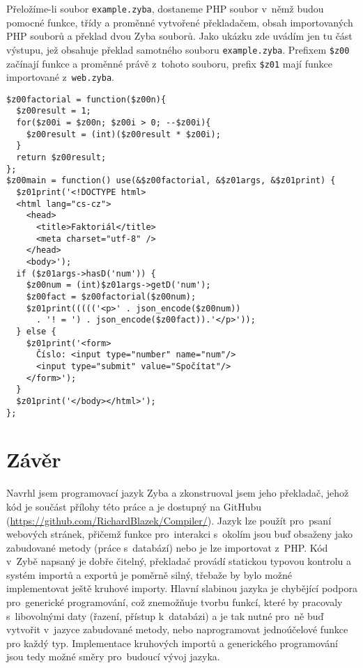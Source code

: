 \documentclass[a4paper,12pt]{article}
\begin{document}
Přeložíme-li soubor \texttt{example.zyba}, dostaneme PHP soubor v~němž budou pomocné funkce, třídy a proměnné vytvořené překladačem, obsah importovaných PHP souborů a překlad dvou Zyba souborů. Jako ukázku zde uvádím jen tu část výstupu, jež obsahuje překlad samotného souboru \texttt{example.zyba}. Prefixem \texttt{\$z00} začínají funkce a proměnné právě z~tohoto souboru, prefix \texttt{\$z01} mají funkce importované z~\texttt{web.zyba}.

\begin{verbatim}
$z00factorial = function($z00n){
  $z00result = 1;
  for($z00i = $z00n; $z00i > 0; --$z00i){
    $z00result = (int)($z00result * $z00i);
  }
  return $z00result;
};
$z00main = function() use(&$z00factorial, &$z01args, &$z01print) {
  $z01print('<!DOCTYPE html>
  <html lang="cs-cz">
    <head>
      <title>Faktoriál</title>
      <meta charset="utf-8" />
    </head>
    <body>');
  if ($z01args->hasD('num')) {
    $z00num = (int)$z01args->getD('num');
    $z00fact = $z00factorial($z00num);
    $z01print((((('<p>' . json_encode($z00num))
      . '! = ') . json_encode($z00fact)).'</p>'));
  } else {
    $z01print('<form>
      Číslo: <input type="number" name="num"/>
      <input type="submit" value="Spočítat"/>
    </form>');
  }
  $z01print('</body></html>');
};
\end{verbatim}

\section{Závěr}
Navrhl jsem programovací jazyk Zyba a zkonstruoval jsem jeho překladač, jehož kód je součást přílohy této práce a je dostupný na GitHubu (\url{https://github.com/RichardBlazek/Compiler/}). Jazyk lze použít pro~psaní webových stránek, přičemž funkce pro~interakci s~okolím jsou buď obsaženy jako zabudované metody (práce s~databází) nebo je lze importovat z~PHP. Kód v~Zybě napsaný je dobře čitelný, překladač provádí statickou typovou kontrolu a systém importů a exportů je poměrně silný, třebaže by bylo možné implementovat ještě kruhové importy. Hlavní slabinou jazyka je chybějící podpora pro~generické programování, což znemožňuje tvorbu funkcí, které by pracovaly s~libovolnými daty (řazení, přístup k~databázi) a je tak nutné pro~ně buď vytvořit v~jazyce zabudované metody, nebo naprogramovat jednoúčelové funkce pro každý typ. Implementace kruhových importů a generického programování jsou tedy možné směry pro~budoucí vývoj jazyka.

\newpage
\printbibliography[heading=bibintoc, title={Použitá literatura}]
\newpage
\end{document}
